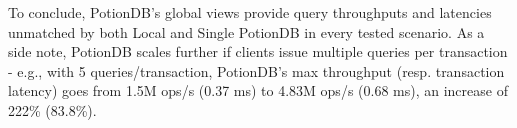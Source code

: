 \documentclass[sigplan,review,anonymous]{acmart}
\begin{document}



To conclude, PotionDB's global views provide query throughputs and latencies unmatched by both Local and Single PotionDB in every tested scenario.
As a side note, PotionDB scales further if clients issue multiple queries per transaction - e.g., with 5 queries/transaction, PotionDB's max throughput (resp. transaction latency) goes from 1.5M ops/s (0.37 ms) to 4.83M ops/s (0.68 ms), an increase of 222\% (83.8\%).
\end{document}
